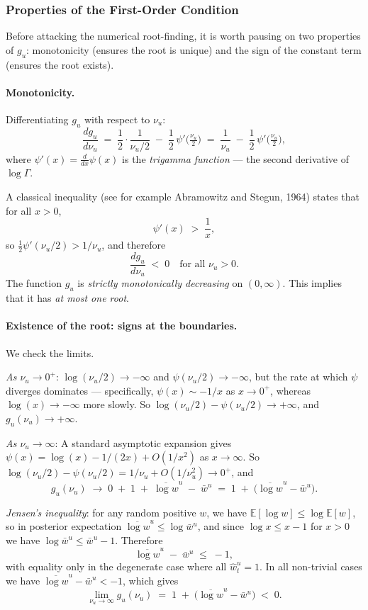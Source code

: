 \documentclass[11pt, a4paper, oneside]{article}
\begin{document}
\subsubsection{Properties of the First-Order Condition}

Before attacking the numerical root-finding, it is worth pausing on
two properties of $g_u$: monotonicity (ensures the root is unique) and
the sign of the constant term (ensures the root exists).

\paragraph{Monotonicity.}
Differentiating $g_u$ with respect to $\nu_u$:
\[
\frac{d g_u}{d \nu_u} \;=\; \frac{1}{2}\cdot \frac{1}{\nu_u/2} \;-\; \frac{1}{2}\,\psi'\!\big(\tfrac{\nu_u}{2}\big)
\;=\; \frac{1}{\nu_u} \;-\; \frac{1}{2}\,\psi'\!\big(\tfrac{\nu_u}{2}\big),
\]
where $\psi'(x) = \frac{d}{dx}\psi(x)$ is the \emph{trigamma function}
— the second derivative of $\log\Gamma$.

A classical inequality (see for example Abramowitz and Stegun, 1964)
states that for all $x > 0$,
\[
\psi'(x) \;>\; \frac{1}{x},
\]
so $\tfrac{1}{2}\psi'(\nu_u/2) > 1/\nu_u$, and therefore
\[
\frac{d g_u}{d \nu_u} \;<\; 0 \quad\text{for all } \nu_u > 0.
\]
The function $g_u$ is \emph{strictly monotonically decreasing} on
$(0, \infty)$. This implies that it has \emph{at most one root}.

\paragraph{Existence of the root: signs at the boundaries.}
We check the limits.

\emph{As $\nu_u \to 0^+$}:
$\log(\nu_u/2) \to -\infty$ and $\psi(\nu_u/2) \to -\infty$, but the
rate at which $\psi$ diverges dominates — specifically,
$\psi(x) \sim -1/x$ as $x \to 0^+$, whereas $\log(x) \to -\infty$ more
slowly. So $\log(\nu_u/2) - \psi(\nu_u/2) \to +\infty$, and
$g_u(\nu_u) \to +\infty$.

\emph{As $\nu_u \to \infty$}:
A standard asymptotic expansion gives $\psi(x) = \log(x) - 1/(2x) + O(1/x^2)$
as $x \to \infty$. So
$\log(\nu_u/2) - \psi(\nu_u/2) = 1/\nu_u + O(1/\nu_u^2) \to 0^+$, and
\[
g_u(\nu_u) \;\longrightarrow\; 0 \;+\; 1 \;+\; \overline{\log w}^u \;-\; \bar{w}^u
\;=\; 1 \;+\; \big(\overline{\log w}^u - \bar{w}^u\big).
\]

\emph{Jensen's inequality}: for any random positive $w$, we have
$\mathbb{E}[\log w] \leq \log \mathbb{E}[w]$, so in posterior expectation
$\overline{\log w}^u \leq \log \bar{w}^u$, and since $\log x \leq x - 1$
for $x > 0$ we have $\log \bar{w}^u \leq \bar{w}^u - 1$. Therefore
\[
\overline{\log w}^u \;-\; \bar{w}^u \;\leq\; -1,
\]
with equality only in the degenerate case where all $\hat{w}^u_t = 1$.
In all non-trivial cases we have $\overline{\log w}^u - \bar{w}^u < -1$,
which gives
\[
\lim_{\nu_u \to \infty} g_u(\nu_u) \;=\; 1 \;+\; \big(\overline{\log w}^u - \bar{w}^u\big) \;<\; 0.
\]
\end{document}
